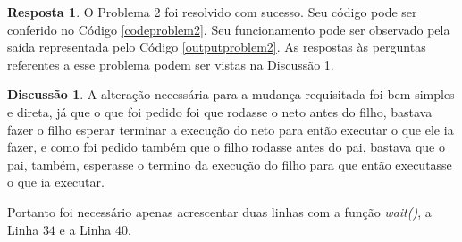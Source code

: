\documentclass[a4paper, 10pt]{article}
\theoremstyle{plain}
\theoremstyle{definition}
\newtheorem{discussion}{Discussão}
\theoremstyle{definition}
\newtheorem{answer}{Resposta}
\begin{document}
\begin{multicols}{2}
\begin{answer}
O Problema 2 foi resolvido com sucesso. Seu código pode ser conferido no Código \ref{codeproblem2}. Seu funcionamento pode ser observado pela saída representada pelo Código \ref{outputproblem2}. As respostas às perguntas referentes a esse problema podem ser vistas na Discussão \ref{dicussionproblem2}.
\end{answer}

%
%

\begin{discussion}
\label{dicussionproblem2}
A alteração necessária para a mudança requisitada foi bem simples e direta, já que o que foi pedido foi que rodasse o neto antes do filho, bastava fazer o filho esperar terminar a execução do neto para então executar o que ele ia fazer, e como foi pedido também que o filho rodasse antes do pai, bastava que o pai, também, esperasse o termino da execução do filho para que então executasse o que ia executar.

Portanto foi necessário apenas acrescentar duas linhas com a função \textit{wait()}, a Linha $34$ e a Linha $40$.
\end{discussion}


\end{multicols}
\end{document}
